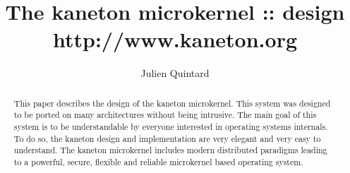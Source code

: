 %
%
%
%
%
%

%
%

%
%

\def\path{../..}

%
%



%
%


%
%

\title{The kaneton microkernel :: design \\
       \scriptsize{http://www.kaneton.org}}

%
%

\author{\small{Julien Quintard}}

%
%



%
%

\maketitle

%
%

\begin{abstract}

This paper describes the design of the kaneton microkernel.
This system was designed to be ported on many architectures without being
intrusive. The main goal of this system is to be understandable
by everyone interested in operating systems internals. To do so, the kaneton
design and implementation are very elegant and very easy to understand.
The kaneton microkernel includes modern distributed paradigms
leading to a powerful, secure, flexible and reliable microkernel based
operating system.

\end{abstract}

%
%

